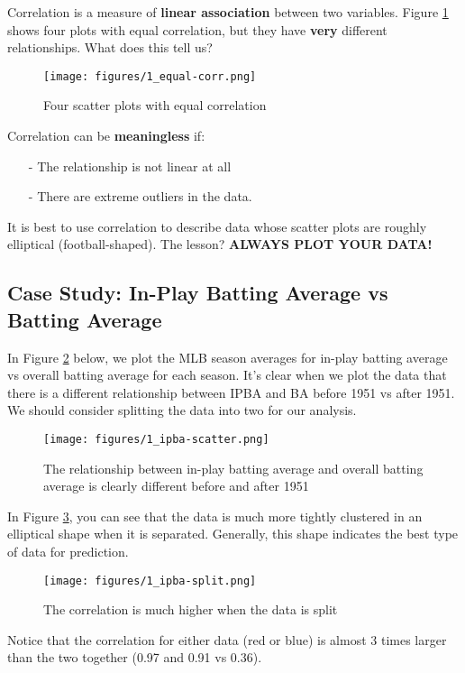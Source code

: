 \documentclass[twoside]{article}
\theoremstyle{definition}
\begin{document}
Correlation is a measure of \textbf{linear association} between two variables. Figure \ref{fig:equal-corr} shows four plots with equal correlation, but they have \textbf{very} different relationships. What does this tell us?
\begin{figure}[H]
    \centering
    \texttt{[image: figures/1\_equal-corr.png]}
    \caption{Four scatter plots with equal correlation}
    \label{fig:equal-corr}
\end{figure}

Correlation can be \textbf{meaningless} if:
\begin{itemize}
    \item[-] The relationship is not linear at all
    \item[-] There are extreme outliers in the data.
\end{itemize}
It is best to use correlation to describe data whose scatter plots are roughly elliptical (football-shaped). The lesson? \textbf{ALWAYS PLOT YOUR DATA!}

\subsection{Case Study: In-Play Batting Average vs Batting Average}

In Figure \ref{fig:ipba-scatter} below, we plot the MLB season averages for in-play batting average vs overall batting average for each season. It's clear when we plot the data that there is a different relationship between IPBA and BA before 1951 vs after 1951. We should consider splitting the data into two for our analysis.
\begin{figure}[H]
    \centering
    \texttt{[image: figures/1\_ipba-scatter.png]}
    \caption{The relationship between in-play batting average and overall batting average is clearly different before and after 1951}
    \label{fig:ipba-scatter}
\end{figure}

In Figure \ref{fig:ipba-split}, you can see that the data is much more tightly clustered in an elliptical shape when it is separated. Generally, this shape indicates the best type of data for prediction.
\begin{figure}[H]
    \centering
    \texttt{[image: figures/1\_ipba-split.png]}
    \caption{The correlation is much higher when the data is split}
    \label{fig:ipba-split}
\end{figure}
Notice that the correlation for either data (red or blue) is almost 3 times larger than the two together (0.97 and 0.91 vs 0.36).
\end{document}

